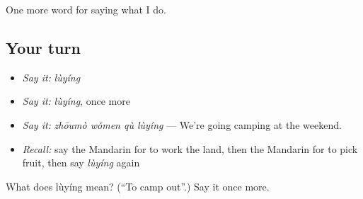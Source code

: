 \begin{grammarlens}[title={What you've built}]
One more word for saying what I do.
\end{grammarlens}

\subsection*{Your turn}
\begin{itemize}
\raggedright
  \item \emph{Say it:} \emph{lùyíng}
  \item \emph{Say it:} \emph{lùyíng}, once more
  \item \emph{Say it:} \emph{zhōumò wǒmen qù lùyíng} — We're going camping at the weekend.
  \item \emph{Recall:} say the Mandarin for to work the land, then the Mandarin for to pick fruit, then say \emph{lùyíng} again
\end{itemize}

\begin{tcolorbox}[breakable,colback=teal!4,colframe=teal!35!black,title={Before you move on}]
What does lùyíng mean? (\textquotedblleft{}To camp out\textquotedblright{}.) Say it once more.
\end{tcolorbox}
